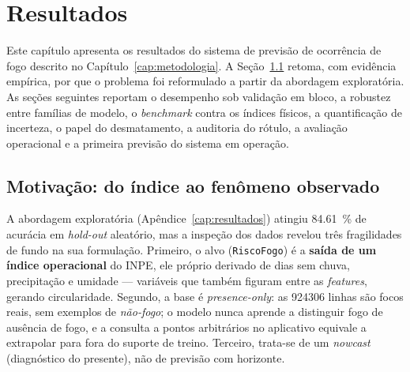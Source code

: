 
\chapter{Resultados}
\label{cap:ocorrencia}

Este capítulo apresenta os resultados do sistema de previsão de ocorrência de fogo descrito no Capítulo~\ref{cap:metodologia}. A Seção~\ref{sec:oco_motivacao} retoma, com evidência empírica, por que o problema foi reformulado a partir da abordagem exploratória. As seções seguintes reportam o desempenho sob validação em bloco, a robustez entre famílias de modelo, o \emph{benchmark} contra os índices físicos, a quantificação de incerteza, o papel do desmatamento, a auditoria do rótulo, a avaliação operacional e a primeira previsão do sistema em operação.

\section{Motivação: do índice ao fenômeno observado}
\label{sec:oco_motivacao}

A abordagem exploratória (Apêndice~\ref{cap:resultados}) atingiu \SI{84,61}{\percent} de acurácia em \emph{hold-out} aleatório, mas a inspeção dos dados revelou três fragilidades de fundo na sua formulação.
Primeiro, o alvo (\texttt{RiscoFogo}) é a \textbf{saída de um índice operacional} do INPE,
ele próprio derivado de dias sem chuva, precipitação e umidade --- variáveis que também
figuram entre as \emph{features}, gerando circularidade. Segundo, a base é
\emph{presence-only}: as \num{924306} linhas são focos reais, sem exemplos de
\emph{não-fogo}; o modelo nunca aprende a distinguir fogo de ausência de fogo, e a consulta
a pontos arbitrários no aplicativo equivale a extrapolar para fora do suporte de treino.
Terceiro, trata-se de um \emph{nowcast} (diagnóstico do presente), não de previsão com
horizonte.

